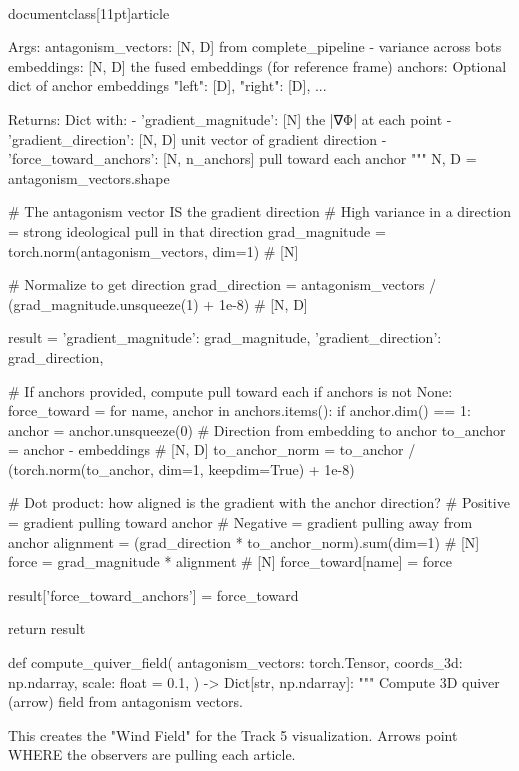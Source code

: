 \\documentclass[11pt]{article}
\begin{document}
\begin{CodeBlock}
    Args:
        antagonism_vectors: [N, D] from complete_pipeline - variance across bots
        embeddings: [N, D] the fused embeddings (for reference frame)
        anchors: Optional dict of anchor embeddings {"left": [D], "right": [D], ...}

    Returns:
        Dict with:
        - 'gradient_magnitude': [N] the |∇Φ| at each point
        - 'gradient_direction': [N, D] unit vector of gradient direction
        - 'force_toward_anchors': [N, n_anchors] pull toward each anchor
    """
    N, D = antagonism_vectors.shape

    # The antagonism vector IS the gradient direction
    # High variance in a direction = strong ideological pull in that direction
    grad_magnitude = torch.norm(antagonism_vectors, dim=1)  # [N]

    # Normalize to get direction
    grad_direction = antagonism_vectors / (grad_magnitude.unsqueeze(1) + 1e-8)  # [N, D]

    result = {
        'gradient_magnitude': grad_magnitude,
        'gradient_direction': grad_direction,
    }

    # If anchors provided, compute pull toward each
    if anchors is not None:
        force_toward = {}
        for name, anchor in anchors.items():
            if anchor.dim() == 1:
                anchor = anchor.unsqueeze(0)
            # Direction from embedding to anchor
            to_anchor = anchor - embeddings  # [N, D]
            to_anchor_norm = to_anchor / (torch.norm(to_anchor, dim=1, keepdim=True) + 1e-8)

            # Dot product: how aligned is the gradient with the anchor direction?
            # Positive = gradient pulling toward anchor
            # Negative = gradient pulling away from anchor
            alignment = (grad_direction * to_anchor_norm).sum(dim=1)  # [N]
            force = grad_magnitude * alignment  # [N]
            force_toward[name] = force

        result['force_toward_anchors'] = force_toward

    return result


def compute_quiver_field(
    antagonism_vectors: torch.Tensor,
    coords_3d: np.ndarray,
    scale: float = 0.1,
) -> Dict[str, np.ndarray]:
    """
    Compute 3D quiver (arrow) field from antagonism vectors.

    This creates the "Wind Field" for the Track 5 visualization.
    Arrows point WHERE the observers are pulling each article.


\end{CodeBlock}
\end{document}
